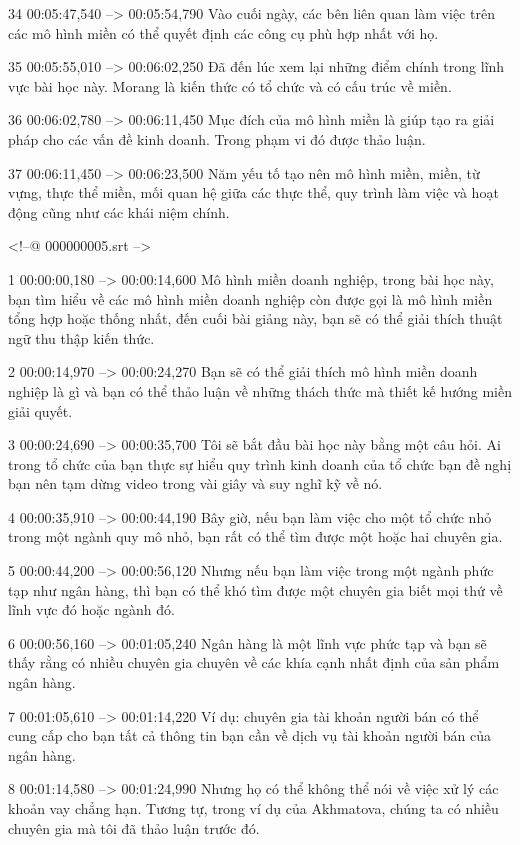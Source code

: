 34
00:05:47,540 --> 00:05:54,790
Vào cuối ngày, các bên liên quan làm việc trên các mô hình miền có thể quyết định các công cụ phù hợp nhất với họ.

35
00:05:55,010 --> 00:06:02,250
Đã đến lúc xem lại những điểm chính trong lĩnh vực bài học này.  Morang là kiến ​​thức có tổ chức và có cấu trúc về miền.

36
00:06:02,780 --> 00:06:11,450
Mục đích của mô hình miền là giúp tạo ra giải pháp cho các vấn đề kinh doanh.  Trong phạm vi đó được thảo luận.

37
00:06:11,450 --> 00:06:23,500
Năm yếu tố tạo nên mô hình miền, miền, từ vựng, thực thể miền, mối quan hệ giữa các thực thể, quy trình làm việc và hoạt động cũng như các khái niệm chính.

<!--@ 000000005.srt -->

1
00:00:00,180 --> 00:00:14,600
Mô hình miền doanh nghiệp, trong bài học này, bạn tìm hiểu về các mô hình miền doanh nghiệp còn được gọi là mô hình miền tổng hợp hoặc thống nhất, đến cuối bài giảng này, bạn sẽ có thể giải thích thuật ngữ thu thập kiến ​​thức.

2
00:00:14,970 --> 00:00:24,270
Bạn sẽ có thể giải thích mô hình miền doanh nghiệp là gì và bạn có thể thảo luận về những thách thức mà thiết kế hướng miền giải quyết.

3
00:00:24,690 --> 00:00:35,700
Tôi sẽ bắt đầu bài học này bằng một câu hỏi.  Ai trong tổ chức của bạn thực sự hiểu quy trình kinh doanh của tổ chức bạn đề nghị bạn nên tạm dừng video trong vài giây và suy nghĩ kỹ về nó.

4
00:00:35,910 --> 00:00:44,190
Bây giờ, nếu bạn làm việc cho một tổ chức nhỏ trong một ngành quy mô nhỏ, bạn rất có thể tìm được một hoặc hai chuyên gia.

5
00:00:44,200 --> 00:00:56,120
Nhưng nếu bạn làm việc trong một ngành phức tạp như ngân hàng, thì bạn có thể khó tìm được một chuyên gia biết mọi thứ về lĩnh vực đó hoặc ngành đó.

6
00:00:56,160 --> 00:01:05,240
Ngân hàng là một lĩnh vực phức tạp và bạn sẽ thấy rằng có nhiều chuyên gia chuyên về các khía cạnh nhất định của sản phẩm ngân hàng.

7
00:01:05,610 --> 00:01:14,220
Ví dụ: chuyên gia tài khoản người bán có thể cung cấp cho bạn tất cả thông tin bạn cần về dịch vụ tài khoản người bán của ngân hàng.

8
00:01:14,580 --> 00:01:24,990
Nhưng họ có thể không thể nói về việc xử lý các khoản vay chẳng hạn.  Tương tự, trong ví dụ của Akhmatova, chúng ta có nhiều chuyên gia mà tôi đã thảo luận trước đó.

